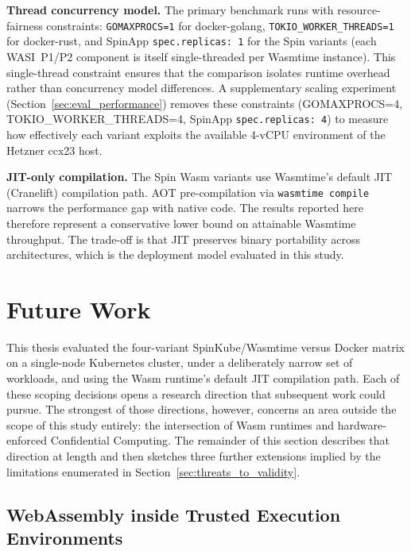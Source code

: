\begin{sloppypar}
\textbf{Thread concurrency model.} The primary benchmark runs with resource-fairness constraints: \texttt{GOMAXPROCS=1} for docker-golang, \texttt{TOKIO\_WORKER\_THREADS=1} for docker-rust, and SpinApp \texttt{spec.replicas:~1} for the Spin variants (each \acs{WASI}~P1/P2 component is itself single-threaded per Wasmtime instance). This single-thread constraint ensures that the comparison isolates runtime overhead rather than concurrency model differences. A supplementary scaling experiment (Section~\ref{sec:eval_performance}) removes these constraints (GOMAXPROCS=4, TOKIO\_WORKER\_THREADS=4, SpinApp \texttt{spec.replicas:~4}) to measure how effectively each variant exploits the available 4-vCPU environment of the Hetzner ccx23 host.
\end{sloppypar}

\begin{sloppypar}
\textbf{JIT-only compilation.} The Spin \acs{Wasm} variants use Wasmtime's default \acs{JIT} (Cranelift) compilation path. \acs{AOT} pre-compilation via \texttt{wasmtime compile} narrows the performance gap with native code. The results reported here therefore represent a conservative lower bound on attainable Wasmtime throughput. The trade-off is that \acs{JIT} preserves binary portability across architectures, which is the deployment model evaluated in this study.
\end{sloppypar}

\section{Future Work}
\label{sec:future_work}

This thesis evaluated the four-variant SpinKube/Wasmtime versus Docker matrix on a single-node Kubernetes cluster, under a deliberately narrow set of workloads, and using the Wasm runtime's default \acs{JIT} compilation path. Each of these scoping decisions opens a research direction that subsequent work could pursue. The strongest of those directions, however, concerns an area outside the scope of this study entirely: the intersection of \acs{Wasm} runtimes and hardware-enforced Confidential Computing. The remainder of this section describes that direction at length and then sketches three further extensions implied by the limitations enumerated in Section~\ref{sec:threats_to_validity}.

\subsection{WebAssembly inside Trusted Execution Environments}
\label{sec:future_work_tee}

